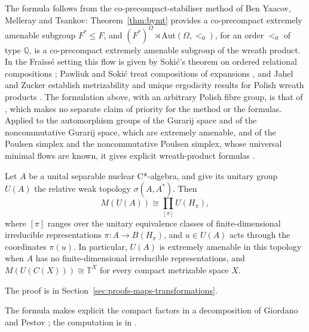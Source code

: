 \begin{remark}\label{rem:lupini-wreath}
The formula follows from the co-precompact-stabiliser method of Ben Yaacov,
Melleray and Tsankov: Theorem~\ref{thm:bymt} provides a co-precompact
extremely amenable subgroup $F^*\leq F$, and
$(F^*)^\Omega\rtimes\mathrm{Aut}(\Omega,<_0)$, for an order $<_0$ of type
$\mathbb{Q}$, is a co-precompact extremely amenable subgroup of the wreath
product. In the Fra\"iss\'e setting this flow is given by Soki\'c's theorem
on ordered relational compositions \cite{Sokic2013}; Pawliuk and Soki\'c treat
compositions of expansions \cite{PawliukSokic2020}, and Jahel and Zucker
establish metrizability and unique ergodicity results for Polish wreath
products \cite{JahelZucker2026}. The formulation above, with an arbitrary
Polish fibre group, is that of \cite[Theorem~4.5]{LupiniPointwise2026}, which
makes no separate claim of priority for the method or the formulas. Applied to
the automorphism groups of the Gurarij space and of the noncommutative
Gurarij space, which are extremely amenable, and of the Poulsen simplex and
the noncommutative Poulsen simplex, whose universal minimal flows are known,
it gives explicit wreath-product formulas
\cite[Corollary~4.6]{LupiniPointwise2026}.
\end{remark}

\begin{theorem}\label{thm:lupini-nuclear}
Let $A$ be a unital separable nuclear C*-algebra, and give its unitary group
$U(A)$ the relative weak topology $\sigma(A,A^*)$. Then
\[
M(U(A))\cong\prod_{[\pi]}U(H_\pi),
\]
where $[\pi]$ ranges over the unitary equivalence classes of
finite-dimensional irreducible representations $\pi\colon A\to B(H_\pi)$, and
$u\in U(A)$ acts through the coordinates $\pi(u)$. In particular, $U(A)$ is
extremely amenable in this topology when $A$ has no finite-dimensional
irreducible representations, and $M(U(C(X)))\cong\mathbb{T}^X$ for every
compact metrizable space $X$.
\end{theorem}

The proof is in Section~\ref{sec:proofs-maps-transformations}.

\begin{remark}\label{rem:lupini-nuclear}
The formula makes explicit the compact factors in a decomposition of Giordano
and Pestov \cite{GiordanoPestov2002,GiordanoPestov2007}; the computation is in
\cite[Theorem~5.18 and Corollary~5.19]{LupiniPointwise2026}.
\end{remark}

